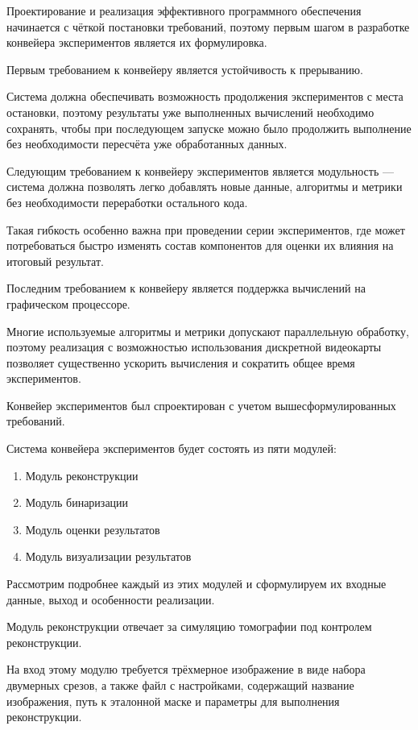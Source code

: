 Проектирование и реализация эффективного программного обеспечения начинается с чёткой постановки требований, поэтому первым шагом в разработке конвейера экспериментов является их формулировка.

Первым требованием к конвейеру является устойчивость к прерыванию.

Система должна обеспечивать возможность продолжения экспериментов с места остановки, поэтому результаты уже выполненных вычислений необходимо сохранять, чтобы при последующем запуске можно было продолжить выполнение без необходимости пересчёта уже обработанных данных.

Следующим требованием к конвейеру экспериментов является модульность — система должна позволять легко добавлять новые данные, алгоритмы и метрики без необходимости переработки остального кода.

 Такая гибкость особенно важна при проведении серии экспериментов, где может потребоваться быстро изменять состав компонентов для оценки их влияния на итоговый результат.

Последним требованием к конвейеру является поддержка вычислений на графическом процессоре.

Многие используемые алгоритмы и метрики допускают параллельную обработку, поэтому реализация с возможностью использования дискретной видеокарты позволяет существенно ускорить вычисления и сократить общее время экспериментов.

Конвейер экспериментов был спроектирован с учетом вышесформулированных требований.

Система конвейера экспериментов будет состоять из пяти модулей:
 
\begin{enumerate}
    \item Модуль реконструкции
    \item Модуль бинаризации
    \item Модуль оценки результатов
    \item Модуль визуализации результатов
\end{enumerate}

Рассмотрим подробнее каждый из этих модулей и сформулируем их входные данные, выход и особенности реализации.

Модуль реконструкции отвечает за симуляцию томографии под контролем реконструкции.

На вход этому модулю требуется трёхмерное изображение в виде набора двумерных срезов, а также файл с настройками, содержащий название изображения, путь к эталонной маске и параметры для выполнения реконструкции.

